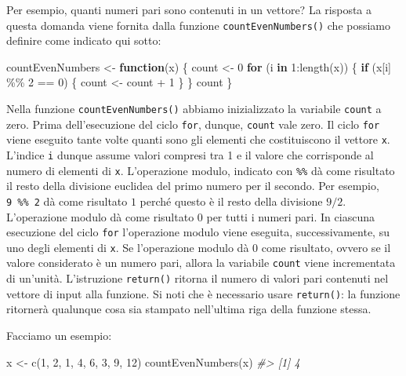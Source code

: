 \documentclass[
]{memoir}
\newenvironment{Shaded}{\begin{snugshade}}{\end{snugshade}}
\newcommand{\CommentTok}[1]{\textcolor[rgb]{0.56,0.35,0.01}{\textit{#1}}}
\newcommand{\ControlFlowTok}[1]{\textcolor[rgb]{0.13,0.29,0.53}{\textbf{#1}}}
\newcommand{\DecValTok}[1]{\textcolor[rgb]{0.00,0.00,0.81}{#1}}
\newcommand{\FunctionTok}[1]{\textcolor[rgb]{0.00,0.00,0.00}{#1}}
\newcommand{\NormalTok}[1]{#1}
\newcommand{\OtherTok}[1]{\textcolor[rgb]{0.56,0.35,0.01}{#1}}
\newcommand{\SpecialCharTok}[1]{\textcolor[rgb]{0.00,0.00,0.00}{#1}}
\theoremstyle{definition}
\theoremstyle{definition}
\theoremstyle{definition}
\theoremstyle{definition}
\theoremstyle{remark}
\begin{document}
Per esempio, quanti numeri pari sono contenuti in un vettore? La
risposta a questa domanda viene fornita dalla funzione
\texttt{countEvenNumbers()} che possiamo definire come indicato qui sotto:

\begin{Shaded}
\begin{Highlighting}[]
\NormalTok{countEvenNumbers }\OtherTok{\textless{}{-}} \ControlFlowTok{function}\NormalTok{(x) \{}
\NormalTok{  count }\OtherTok{\textless{}{-}} \DecValTok{0}
  \ControlFlowTok{for}\NormalTok{ (i }\ControlFlowTok{in} \DecValTok{1}\SpecialCharTok{:}\FunctionTok{length}\NormalTok{(x)) \{}
    \ControlFlowTok{if}\NormalTok{ (x[i] }\SpecialCharTok{\%\%} \DecValTok{2} \SpecialCharTok{==} \DecValTok{0}\NormalTok{) \{}
\NormalTok{      count }\OtherTok{\textless{}{-}}\NormalTok{ count }\SpecialCharTok{+} \DecValTok{1}
\NormalTok{    \}}
\NormalTok{  \}}
\NormalTok{  count}
\NormalTok{\}}
\end{Highlighting}
\end{Shaded}

Nella funzione \texttt{countEvenNumbers()} abbiamo inizializzato la variabile
\texttt{count} a zero. Prima dell'esecuzione del ciclo \texttt{for}, dunque, \texttt{count}
vale zero. Il ciclo \texttt{for} viene eseguito tante volte quanti sono gli
elementi che costituiscono il vettore \texttt{x}. L'indice \texttt{i} dunque assume
valori compresi tra 1 e il valore che corrisponde al numero di elementi
di \texttt{x}. L'operazione modulo, indicato con \texttt{\%\%} dà come risultato il
resto della divisione euclidea del primo numero per il secondo. Per
esempio, \texttt{9\ \%\%\ 2} dà come risultato \(1\) perché questo è il resto della
divisione \(9/2\). L'operazione modulo dà come risultato \(0\) per tutti i
numeri pari. In ciascuna esecuzione del ciclo \texttt{for} l'operazione modulo
viene eseguita, successivamente, su uno degli elementi di \texttt{x}. Se
l'operazione modulo dà \(0\) come risultato, ovvero se il valore
considerato è un numero pari, allora la variabile \texttt{count} viene
incrementata di un'unità. L'istruzione \texttt{return()} ritorna il
numero di valori pari contenuti nel vettore di input alla funzione.
Si noti che è necessario usare \texttt{return()}: la funzione ritornerà qualunque cosa sia stampato nell'ultima riga della funzione stessa.

Facciamo un esempio:

\begin{Shaded}
\begin{Highlighting}[]
\NormalTok{x }\OtherTok{\textless{}{-}} \FunctionTok{c}\NormalTok{(}\DecValTok{1}\NormalTok{, }\DecValTok{2}\NormalTok{, }\DecValTok{1}\NormalTok{, }\DecValTok{4}\NormalTok{, }\DecValTok{6}\NormalTok{, }\DecValTok{3}\NormalTok{, }\DecValTok{9}\NormalTok{, }\DecValTok{12}\NormalTok{)}
\FunctionTok{countEvenNumbers}\NormalTok{(x)}
\CommentTok{\#\textgreater{} [1] 4}
\end{Highlighting}
\end{Shaded}
\end{document}
